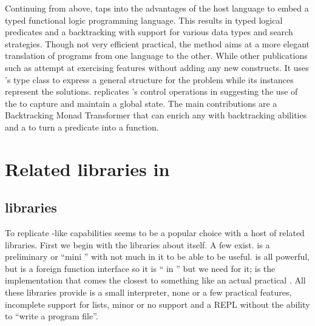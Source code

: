 \documentclass[thesis-solanki.tex]{subfiles}
\begin{document}
Continuing from above, \cite{claessen2000typed} taps into the advantages of the host language to embed a typed
functional logic programming language.
This results in typed logical predicates and a backtracking  with support for various data
types and search strategies.
Though not very efficient  practical,
the method aims at a more elegant translation of programs from one language
to the other.
While other publications such as \cite{erwig2004escape} attempt at exercising  features without adding any new 
constructs. 
It uses 's type class to express a general structure for the problem while its instances
represent the solutions.
\cite{hinze1998prological} replicates 's control operations in  suggesting the
use of the   to capture and maintain a global state.
The main contributions are a Backtracking Monad Transformer that can enrich any  with
backtracking abilities and a  to turn a  predicate into a
 function.



\section{Related libraries in }
\subsection{ libraries}

To replicate -like
capabilities  seems to be a popular choice
with a host of related libraries.
First we begin with the libraries about  itself.
A few exist. \cite{nanoprolog-lib} is a preliminary or
``mini '' with not much in it to be able to be useful. \cite{hswip-lib}
is all powerful, but is a foreign function interface so it is `` in '' but we
need  for it;
\cite{prolog-lib}
is the implementation that comes the closest
to something like an actual practical .
All these libraries provide is a small interpreter, none or a few practical features, incomplete support for lists, minor or
no  support and a REPL without the ability to ``write a  program
file''.
\end{document}
